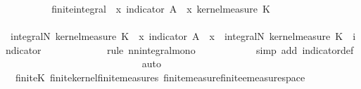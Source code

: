 \begin{isabellebody}
\ \ \ \ \ \ \isamarkupfalse%
\ \isamarkupfalse%
\ finite{\isacharunderscore}{\kern0pt}integral{\isacharcolon}{\kern0pt}\ {\isachardoublequoteopen}{\isacharparenleft}{\kern0pt}{\isasymintegral}\isactrlsup {\isacharplus}{\kern0pt}\ x{\isachardot}{\kern0pt}\ indicator\ A\ {\isacharparenleft}{\kern0pt}{\isasymomega}\ x{\isacharparenright}{\kern0pt}\ {\isasympartial}kernel{\isacharunderscore}{\kern0pt}measure\ K\ {\isasymomega}\ {\isacharless}{\kern0pt}\ {\isasyminfinity}{\isachardoublequoteclose}\isanewline
\ \ \ \ \ \ \isamarkupfalse%
\ {\isacharminus}{\kern0pt}\isanewline
\ \ \ \ \ \ \ \ \isamarkupfalse%
\ {\isachardoublequoteopen}integral\isactrlsup N\ {\isacharparenleft}{\kern0pt}kernel{\isacharunderscore}{\kern0pt}measure\ K\ {\isasymomega}\ {\isacharparenleft}{\kern0pt}{\isasymlambda}x{\isachardot}{\kern0pt}\ indicator\ A\ {\isacharparenleft}{\kern0pt}{\isasymomega}\ x{\isacharparenright}{\kern0pt}{\isacharparenright}{\kern0pt}\ {\isasymle}\ integral\isactrlsup N\ {\isacharparenleft}{\kern0pt}kernel{\isacharunderscore}{\kern0pt}measure\ K\ {\isasymomega}\ {\isacharparenleft}{\kern0pt}indicator\ {\isacharquery}{\kern0pt}{\isasymOmega}\isanewline
\ \ \ \ \ \ \ \ \ \ \isamarkupfalse%
\ {\isacharparenleft}{\kern0pt}rule\ nn{\isacharunderscore}{\kern0pt}integral{\isacharunderscore}{\kern0pt}mono{\isacharparenright}{\kern0pt}\isanewline
\ \ \ \ \ \ \ \ \ \ \isamarkupfalse%
\ {\isacharparenleft}{\kern0pt}simp\ add{\isacharcolon}{\kern0pt}\ indicator{\isacharunderscore}{\kern0pt}def{\isacharparenright}{\kern0pt}\isanewline
\ \ \ \ \ \ \ \ \isamarkupfalse%
\ \isamarkupfalse%
\ {\isachardoublequoteopen}{\isachardot}{\kern0pt}{\isachardot}{\kern0pt}{\isachardot}{\kern0pt}\ {\isacharless}{\kern0pt}\ {\isasyminfinity}{\isachardoublequoteclose}\ \ \isanewline
\ \ \ \ \ \ \ \ \ \ \isamarkupfalse%
\ auto\isanewline
\ \ \ \ \ \ \ \ \ \ \isamarkupfalse%
\ {\isasymomega}\ finite{\isacharunderscore}{\kern0pt}K\ finite{\isacharunderscore}{\kern0pt}kernel{\isachardot}{\kern0pt}finite{\isacharunderscore}{\kern0pt}measures\ finite{\isacharunderscore}{\kern0pt}measure{\isachardot}{\kern0pt}finite{\isacharunderscore}{\kern0pt}emeasure{\isacharunderscore}{\kern0pt}space\isanewline

\end{isabellebody}
